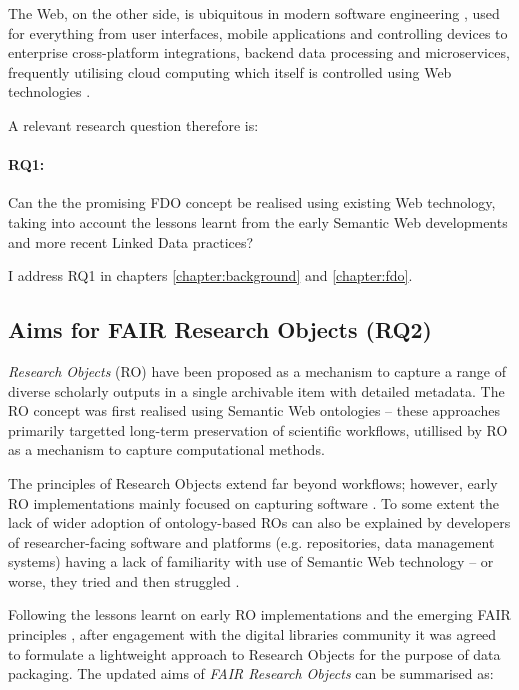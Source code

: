 The Web, on the other side, is ubiquitous in modern software engineering \cite{Taivalsaari 2021}, used for everything from user interfaces, mobile applications and controlling devices to enterprise cross-platform integrations, backend data processing and microservices, frequently utilising cloud computing which itself is controlled using Web technologies \cite{Marinescu 2023}.

A relevant research question therefore is: 

\paragraph{RQ1:}\label{rq1} 
Can the the promising FDO concept be realised using existing Web technology, taking into account the lessons learnt from the early Semantic Web developments and more recent Linked Data practices?

I address RQ1 in chapters \ref{chapter:background} and \ref{chapter:fdo}.


\subsection{Aims for FAIR Research Objects (RQ2)}
\label{intro:rq2}

\emph{Research Objects} (RO) \cite{Bechhofer 2013} have been proposed as a mechanism to capture a range of diverse scholarly outputs in a single archivable item with detailed metadata. The RO concept was first realised using Semantic Web ontologies \cite{myExperiment 2009,Belhajjame 2015} -- these approaches primarily targetted long-term preservation of scientific workflows, utillised by RO as a mechanism to capture computational methods.

The principles of Research Objects extend far beyond workflows; however, early RO implementations mainly focused on capturing software \cite{Goble 2018}. To some extent the lack of wider adoption of ontology-based ROs can also be explained by developers of researcher-facing software and platforms (e.g. repositories, data management systems) having a lack of familiarity with use of Semantic Web technology -- or worse, they tried and then struggled \cite{Carriero 2010,Tudorache 2020}.

Following the lessons learnt on early RO implementations and the emerging FAIR principles \cite{Wilkinson 2016,Jacobsen 2020}, after engagement with the digital libraries community it was agreed to formulate a lightweight approach to Research Objects \cite{Sefton 2018,Ó Carragáin 2019b} for the purpose of data packaging. The updated aims of \emph{FAIR Research Objects} can be summarised as:
 
